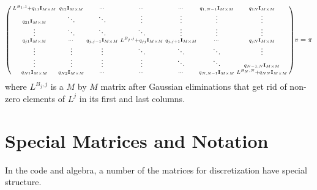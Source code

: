 \documentclass[11pt]{article}
\newenvironment{psmallmatrix}
{\left(\begin{smallmatrix}}
	{\end{smallmatrix}\right)}
\theoremstyle{definition}
\begin{document}
\begin{align}
\begin{psmallmatrix}
L^{B_1,1} + q_{11} \mathbf{I}_{M \times M} & q_{12} \mathbf{I}_{M \times M} & \cdots &  \cdots & \cdots & q_{1,N-1} \mathbf{I}_{M \times M} &  q_{1N} \mathbf{I}_{M \times M} \\ 
 q_{21} \mathbf{I}_{M \times M} & \ddots & \ddots & \vdots & \vdots & \vdots & \vdots  \\
\vdots & \ddots & \ddots & \ddots  & \vdots & \vdots & \vdots
\\
 q_{j1} \mathbf{I}_{M \times M} &  \cdots &  q_{j,j-1}  \mathbf{I}_{M \times M} & {L}^{B_j,j} + q_{jj} \mathbf{I}_{M \times M} &  q_{j,j+1} \mathbf{I}_{M \times M} & \cdots &  q_{jN} \mathbf{I}_{M \times M} \\
\vdots & \vdots& \vdots &  \ddots & \ddots & \ddots  & \vdots \\ 
\vdots & \vdots  & \vdots& \vdots &  \ddots & \ddots &  q_{N-1,N} \mathbf{I}_{M \times M} \\
 q_{N1} \mathbf{I}_{M \times M} &  q_{N2} \mathbf{I}_{M \times M} & \cdots &  \cdots & \cdots &  q_{N,N-1} \mathbf{I}_{M \times M} & {L}^{B_N,N} +  q_{NN} \mathbf{I}_{M \times M}
\end{psmallmatrix}
v
=
\pi 
\end{align}
where $L^{B_j,j}$ is a $M$ by $M$ matrix after Gaussian eliminations that get rid of non-zero elements of $L^{j}$ in its first and last columns.

\newpage

\appendix

\section{Special Matrices and Notation}\label{sec:special-matrices}
In the code and algebra, a number of the matrices for discretization have special structure.
\end{document}
